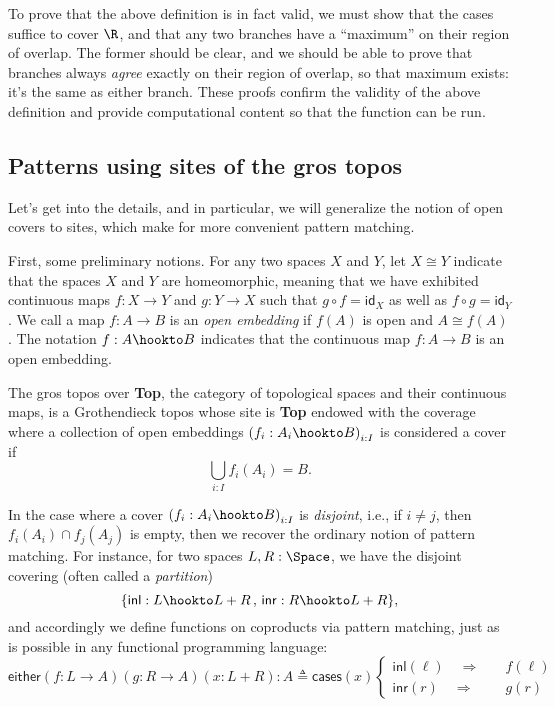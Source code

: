 To prove that the above definition is in fact valid, we must show that the cases suffice to cover $\R$, and that any two branches have a ``maximum'' on their region of overlap. The former should be clear, and we should be able to prove that branches always \emph{agree} exactly on their region of overlap, so that maximum exists: it's the same as either branch. These proofs confirm the validity of the above definition and provide computational content so that the function can be run.

\subsection{Patterns using sites of the gros topos}

Let's get into the details, and in particular, we will generalize the notion of open covers to sites, which make for more convenient pattern matching.

First, some preliminary notions. For any two spaces $X$ and $Y$, let $X \cong Y$ indicate that the spaces $X$ and $Y$ are homeomorphic, meaning that we have exhibited continuous maps $f : X \to Y$ and $g : Y \to X$ such that $g \circ f = \mathsf{id}_X$ as well as $f \circ g = \mathsf{id}_Y$.
We call a map $f : A \to B$ is an \emph{open embedding} if $f(A)$ is open and $A \cong f(A)$. The notation $f : A \hookto B$ indicates that the continuous map $f : A \to B$ is an open embedding.

The gros topos over \textbf{Top}, the category of topological spaces and their continuous maps, is a Grothendieck topos whose site is \textbf{Top} endowed with the coverage where a collection of open embeddings $\left( f_i : A_i \hookto B \right)_{i : I}$ is considered a cover if
\[
\bigcup_{i : I} f_i(A_i) = B.
\]

In the case where a cover $\left( f_i : A_i \hookto B \right)_{i : I}$ is \emph{disjoint}, i.e., if $i \ne j$, then $f_i(A_i) \cap f_j(A_j)$ is empty, then we recover the ordinary notion of pattern matching. For instance, for two spaces $L, R : \Space$, we have the disjoint covering (often called a \emph{partition})
\[
\{ \mathsf{inl} : L \hookto L + R \,,\, \mathsf{inr} : R \hookto L + R \},
\]
and accordingly we define functions on coproducts via pattern matching, just as is possible in any functional programming language:
\[
\mathsf{either} (f : L \to A) (g : R \to A) (x : L + R) : A \triangleq
  \mathsf{cases}(x)
  \begin{cases}
  \mathsf{inl}(\ell) \quad \Longrightarrow \quad &f(\ell)
  \\ \mathsf{inr}(r) \quad \Longrightarrow \quad &g(r)
  \end{cases}
\]

